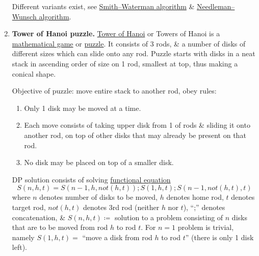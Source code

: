 \documentclass{article}
\begin{document}
\begin{enumerate}
	Different variants exist, see \href{https://en.wikipedia.org/wiki/Smith%E2%80%93Waterman_algorithm}{Smith--Waterman algorithm} \& \href{https://en.wikipedia.org/wiki/Needleman%E2%80%93Wunsch_algorithm}{Needleman--Wunsch algorithm}.
	\item {\bf Tower of Hanoi puzzle.} \href{https://en.wikipedia.org/wiki/Tower_of_Hanoi}{Tower of Hanoi} or Towers of Hanoi is a \href{https://en.wikipedia.org/wiki/Mathematical_game}{mathematical game} or \href{https://en.wikipedia.org/wiki/Puzzle}{puzzle}. It consists of 3 rods, \& a number of disks of different sizes which can slide onto any rod. Puzzle starts with disks in a neat stack in ascending order of size on 1 rod, smallest at top, thus making a conical shape.
	
	Objective of puzzle: move entire stack to another rod, obey rules:
	\begin{enumerate}
		\item Only 1 disk may be moved at a time.
		\item Each move consists of taking upper disk from 1 of rods \& sliding it onto another rod, on top of other disks that may already be present on that rod.
		\item No disk may be placed on top of a smaller disk.
	\end{enumerate}
	DP solution consists of solving \href{https://en.wikipedia.org/wiki/Bellman_equation}{functional equation}
	\begin{equation*}
		S(n,h,t) = S(n - 1,h,not(h,t));S(1,h,t);S(n - 1,not(h,t),t)
	\end{equation*}
	where $n$ denotes number of disks to be moved, $h$ denotes home rod, $t$ denotes target rod, $not(h,t)$ denotes 3rd rod (neither $h$ nor $t$), ``;'' denotes concatenation, \& $S(n,h,t)\coloneqq$ solution to a problem consisting of $n$ disks that are to be moved from rod $h$ to rod $t$. For $n = 1$ problem is trivial, namely $S(1,h,t) =$ ``move a disk from rod $h$ to rod $t$'' (there is only 1 disk left).
	

\end{enumerate}
\end{document}
